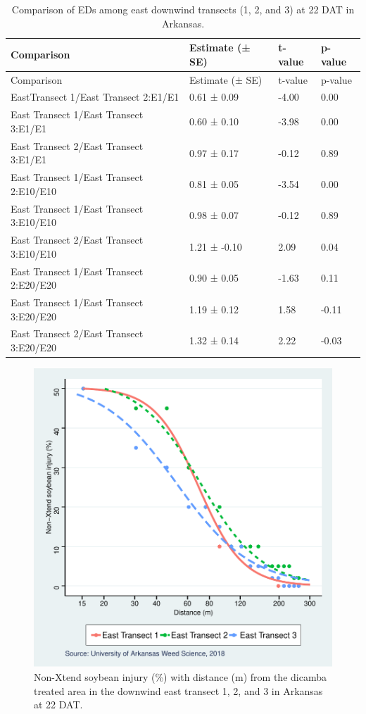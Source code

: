 \documentclass[]{article}
\begin{document}
\begin{longtable}[]{@{}llll@{}}
\caption{Comparison of EDs among east downwind transects (1, 2, and 3)
at 22 DAT in Arkansas.}\tabularnewline
\toprule
Comparison & Estimate (± SE) & t-value & p-value\tabularnewline
\midrule
\endfirsthead
\toprule
Comparison & Estimate (± SE) & t-value & p-value\tabularnewline
\midrule
\endhead
EastTransect 1/East Transect 2:E1/E1 & 0.61 ± 0.09 & -4.00 &
0.00\tabularnewline
East Transect 1/East Transect 3:E1/E1 & 0.60 ± 0.10 & -3.98 &
0.00\tabularnewline
East Transect 2/East Transect 3:E1/E1 & 0.97 ± 0.17 & -0.12 &
0.89\tabularnewline
East Transect 1/East Transect 2:E10/E10 & 0.81 ± 0.05 & -3.54 &
0.00\tabularnewline
East Transect 1/East Transect 3:E10/E10 & 0.98 ± 0.07 & -0.12 &
0.89\tabularnewline
East Transect 2/East Transect 3:E10/E10 & 1.21 ± -0.10 & 2.09 &
0.04\tabularnewline
East Transect 1/East Transect 2:E20/E20 & 0.90 ± 0.05 & -1.63 &
0.11\tabularnewline
East Transect 1/East Transect 3:E20/E20 & 1.19 ± 0.12 & 1.58 &
-0.11\tabularnewline
East Transect 2/East Transect 3:E20/E20 & 1.32 ± 0.14 & 2.22 &
-0.03\tabularnewline
\bottomrule
\end{longtable}

\begin{figure}
\centering
\includegraphics{Report_files/figure-latex/unnamed-chunk-15-1.pdf}
\caption{Non-Xtend soybean injury (\%) with distance (m) from the
dicamba treated area in the downwind east transect 1, 2, and 3 in
Arkansas at 22 DAT.}
\end{figure}
\end{document}
